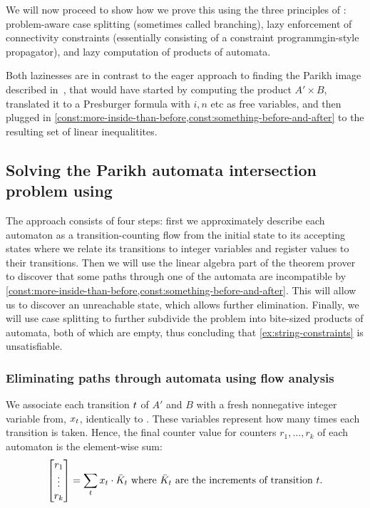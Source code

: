 We will now proceed to show how we prove this using the three principles of
\Calculus{}: problem-aware case splitting (sometimes called branching), lazy
enforcement of connectivity constraints (essentially consisting of a constraint
programmgin-style propagator), and lazy computation of products of automata.

Both lazinesses are in contrast to the eager approach to finding the Parikh
image described in~\cite{generate-parikh-image}, that would have started by
computing the product $A' \times B$, translated it to a Presburger formula with
$i, n$ etc as free variables, and then plugged in
\cref{const:more-inside-than-before,const:something-before-and-after} to the
resulting set of linear inequalitites.

\subsection{Solving the Parikh automata intersection problem using \Calculus{}}

The approach consists of four steps: first we approximately describe each
automaton as a transition-counting flow from the initial state to its accepting
states where we relate its transitions to integer variables and register values
to their transitions. Then we will use the linear algebra part of the theorem
prover to discover that some paths through one of the automata are incompatible
by \cref{const:more-inside-than-before,const:something-before-and-after}. This
will allow us to discover an unreachable state, which allows further
elimination. Finally, we will use case splitting to further subdivide the
problem into bite-sized products of automata, both of which are empty, thus
concluding that \cref{ex:string-constraints} is unsatisfiable.

\subsubsection{Eliminating paths through automata using flow analysis}\label{sec:a_1}

We associate each transition $t$ of $A'$ and $B$ with a fresh
nonnegative integer variable from, $x_t$, identically to
\cite{generate-parikh-image}. These variables represent how many times each
transition is taken. Hence, the final counter value for counters $r_1, \ldots,
r_k$ of each automaton is the element-wise sum:
\begin{equation}\label{eq:counter-sums}
\begin{bmatrix} 
  r_1 \\
  \vdots\\
  r_k \\
\end{bmatrix} = \sum_t x_t \cdot 
  \bar{K}_t \text{ where $\bar{K}_t$ are the increments of transition $t$}.
\end{equation}

